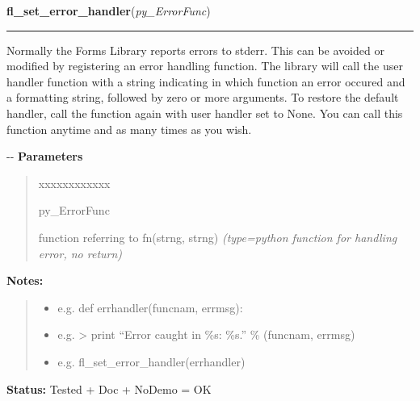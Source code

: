 \hspace{.8\funcindent}\begin{boxedminipage}{\funcwidth}

    \raggedright \textbf{fl\_set\_error\_handler}(\textit{py\_ErrorFunc})

    \vspace{-1.5ex}

    \rule{\textwidth}{0.5\fboxrule}
\setlength{\parskip}{2ex}

Normally the Forms Library reports errors to stderr. This can be avoided
or modified by registering an error handling function. The library will
call the user handler function with a string indicating in which function
an error occured and a formatting string, followed by zero or more
arguments. To restore the default handler, call the function again with
user handler set to None. You can call this function anytime and as many
times as you wish.

-{}-
\setlength{\parskip}{1ex}
      \textbf{Parameters}
      \vspace{-1ex}

      \begin{quote}
        \begin{Ventry}{xxxxxxxxxxxx}

          \item[py\_ErrorFunc]


function referring to fn(strng, strng)
            {\it (type=python function for handling error, no return)}

        \end{Ventry}

      \end{quote}

\textbf{Notes:}
\begin{quote}
  \begin{itemize}

  \item
    \setlength{\parskip}{0.6ex}

e.g. def errhandler(funcnam, errmsg):


  \item 
e.g. > print ``Error caught in \%s: \%s.'' \% (funcnam, errmsg)


  \item 
e.g. fl\_set\_error\_handler(errhandler)


\end{itemize}

\end{quote}

\textbf{Status:} 
Tested + Doc + NoDemo = OK


    \end{boxedminipage}

